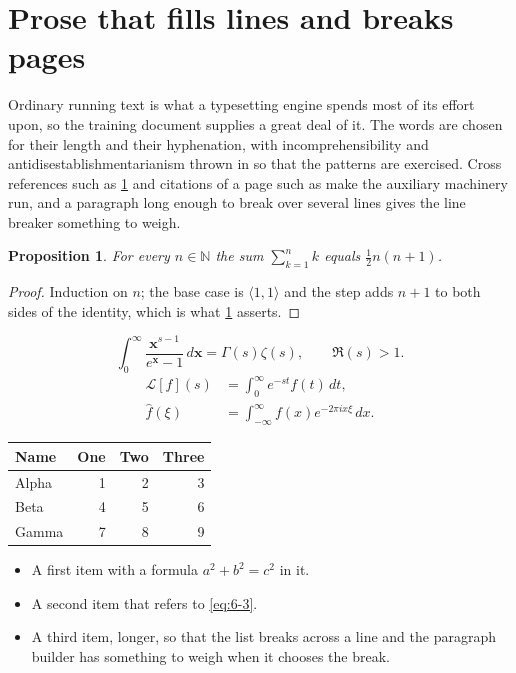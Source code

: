 \documentclass[11pt,a4paper]{report}
\theoremstyle{plain}
\newtheorem{proposition}{Proposition}[chapter]
\newcommand{\vecn}[1]{\mathbf{#1}}
\newcommand{\pairs}[2]{\langle #1,#2\rangle}
\begin{document}
\section{Prose that fills lines and breaks pages}
\label{sec:prose6-3}
Ordinary running text is what a typesetting engine spends most of its effort
upon, so the training document supplies a great deal of it. The words are
chosen for their length and their hyphenation, with incomprehensibility and
antidisestablishmentarianism thrown in so that the patterns are exercised.
Cross references such as \cref{sec:prose6-3} and citations of a page such
as \pageref{sec:prose6-3} make the auxiliary machinery run, and a
paragraph long enough to break over several lines gives the line breaker
something to weigh.
\begin{proposition}\label{prop:6-3}
For every $n\in\mathbb{N}$ the sum $\sum_{k=1}^{n}k$ equals
$\tfrac{1}{2}n(n+1)$.
\end{proposition}
\begin{proof}
Induction on $n$; the base case is $\pairs{1}{1}$ and the step adds $n+1$ to
both sides of the identity, which is what \cref{prop:6-3} asserts.
\end{proof}
\begin{equation}\label{eq:6-3}
  \int_{0}^{\infty}\frac{\vecn{x}^{s-1}}{e^{\vecn{x}}-1}\,d\vecn{x}
    = \Gamma(s)\zeta(s),\qquad \Re(s)>1 .
\end{equation}
\begin{align}
  \mathcal{L}[f](s) &= \int_{0}^{\infty} e^{-st} f(t)\,dt, \\
  \widehat{f}(\xi)  &= \int_{-\infty}^{\infty} f(x) e^{-2\pi i x\xi}\,dx .
\end{align}
\par\noindent\begin{center}
\begin{tabular}{lrrr}
\hline
Name & One & Two & Three \\
\hline
Alpha & 1 & 2 & 3 \\
Beta & 4 & 5 & 6 \\
Gamma & 7 & 8 & 9 \\
\hline
\end{tabular}
\end{center}
\begin{itemize}
  \item A first item with a formula $a^2+b^2=c^2$ in it.
  \item A second item that refers to \eqref{eq:6-3}.
  \item A third item, longer, so that the list breaks across a line and the
    paragraph builder has something to weigh when it chooses the break.
\end{itemize}
\end{document}
